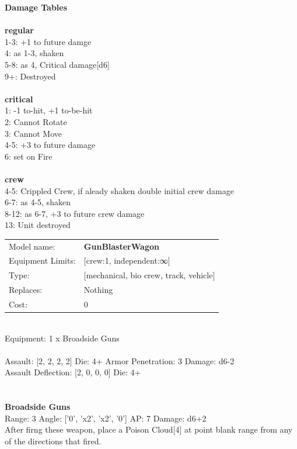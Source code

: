 {\bf Damage Tables} \\
\ \\ {\bf regular } \\
1-3: +1 to future damge \\
4: as 1-3, shaken \\
5-8: as 4, Critical damage[d6] \\
9+: Destroyed \\
\ \\ {\bf critical } \\
1: -1 to-hit, +1 to-be-hit \\
2: Cannot Rotate \\
3: Cannot Move \\
4-5: +3 to future damage \\
6: set on Fire \\
\ \\ {\bf crew } \\
4-5: Crippled Crew, if aleady shaken double initial crew damage \\
6-7: as 4-5, shaken \\
8-12: as 6-7, +3 to future crew damage \\
13: Unit destroyed \\


\noindent
\begin{tabular}{ll}
Model name: &{\bf GunBlasterWagon } \\
Equipment Limits: &[crew:1, independent:∞] \\
Type: &[mechanical, bio crew, track, vehicle] \\
Replaces: &Nothing \\
Cost: & 0\\
\end{tabular}
\ \\
Equipment: 1 x Broadside Guns \\
\ \\
Assault: [2, 2, 2, 2] Die: 4+ Armor Penetration: 3 Damage: d6-2 \\
Assault Deflection: [2, 0, 0, 0] Die: 4+\\
\indent  
\ \\

\ \\
{\bf Broadside Guns } \\



Range: 3  Angle: ['0', 'x2', 'x2', '0'] AP: 7 Damage: d6+2 \\
After firng these weapon, place a Poison Cloud[4] at point blank range from any of the directions that fired.\\ 




